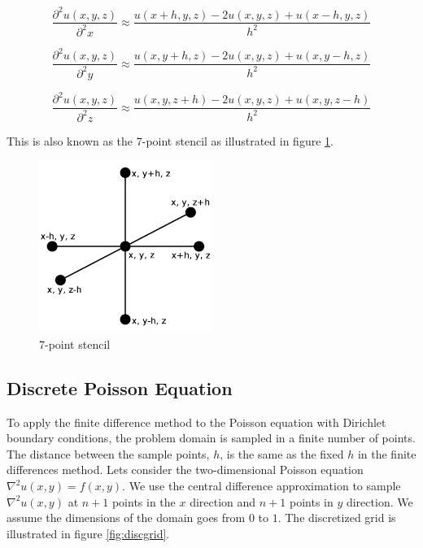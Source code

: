 $$\frac{\partial^2 u(x, y, z)}{\partial^2 x} \approx \frac{u(x+h, y, z) - 2u(x, y, z) + u(x-h, y, z)}{h^2}$$

$$\frac{\partial^2 u(x, y, z)}{\partial^2 y} \approx \frac{u(x, y+h, z) - 2u(x, y, z) + u(x, y-h, z)}{h^2}$$

$$\frac{\partial^2 u(x, y, z)}{\partial^2 z} \approx \frac{u(x, y, z+h) - 2u(x, y, z) + u(x, y, z-h)}{h^2}$$

This is also known as the 7-point stencil as illustrated in figure \ref{fig:7ps}.

\begin{figure}[ht]
	\center
	\includegraphics[width=0.5\textwidth]{images/7_point_stencil}
	\caption{7-point stencil}
	\label{fig:7ps}
\end{figure}

\subsection{Discrete Poisson Equation}

To apply the finite difference method to the Poisson equation with Dirichlet 
boundary conditions, the problem domain is sampled in a finite number of points. 
The distance between the sample points, $h$, is the same as the fixed $h$ in the finite
differences method. Lets consider the two-dimensional Poisson equation $\nabla^2
u(x, y) = f(x, y)$. We use the central difference approximation to sample
$\nabla^2 u(x, y)$ at $n+1$ points in the $x$ direction and $n+1$ points in $y$
direction. We assume the dimensions of the domain goes from $0$ to $1$. The discretized 
grid is illustrated in figure \ref{fig:discgrid}.

